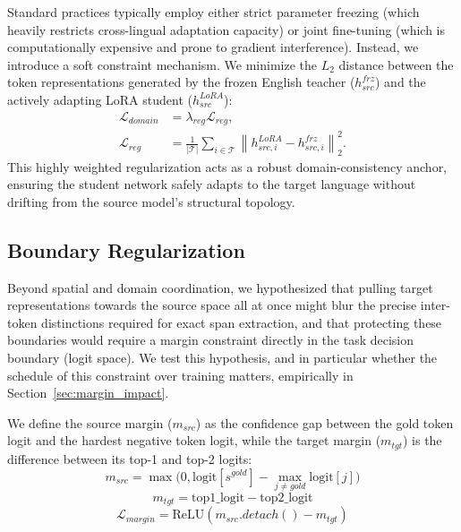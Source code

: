 \documentclass[11pt]{article}
\begin{document}
Standard practices typically employ either strict parameter freezing (which heavily restricts cross-lingual adaptation capacity) or joint fine-tuning (which is computationally expensive and prone to gradient interference). Instead, we introduce a soft constraint mechanism. We minimize the $L_2$ distance between the token representations generated by the frozen English teacher ($h^{frz}_{src}$) and the actively adapting LoRA student ($h^{LoRA}_{src}$):
\[
\begin{aligned}
\mathcal{L}_{domain} &= \lambda_{reg}\mathcal{L}_{reg}, \\
\mathcal{L}_{reg} &= \frac{1}{|\mathcal{T}|}
\sum_{i \in \mathcal{T}}
\left\|h^{LoRA}_{src,i} - h^{frz}_{src,i}\right\|^2_2.
\end{aligned}
\]
This highly weighted regularization acts as a robust domain-consistency anchor, ensuring the student network safely adapts to the target language without drifting from the source model's structural topology.

\subsection{Boundary Regularization}
\label{sec:temporal}
Beyond spatial and domain coordination, we hypothesized that pulling target representations towards the source space all at once might blur the precise inter-token distinctions required for exact span extraction, and that protecting these boundaries would require a margin constraint directly in the task decision boundary (logit space). We test this hypothesis, and in particular whether the schedule of this constraint over training matters, empirically in Section~\ref{sec:margin_impact}.

We define the source margin ($m_{src}$) as the confidence gap between the gold token logit and the hardest negative token logit, while the target margin ($m_{tgt}$) is the difference between its top-1 and top-2 logits:
$$ m_{src} = \max\Big(0, \text{logit}[s^{gold}] - \max_{j \neq gold} \text{logit}[j]\Big) $$
$$ m_{tgt} = \text{top1\_logit} - \text{top2\_logit} $$
$$ \mathcal{L}_{margin} = \text{ReLU}(m_{src}.detach() - m_{tgt}) $$
\end{document}
